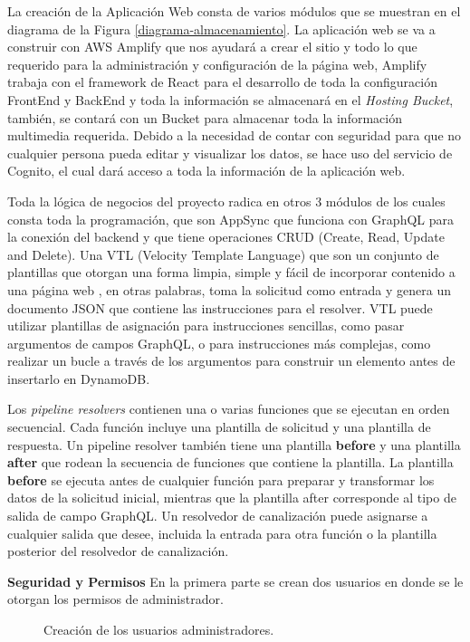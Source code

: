 \noindent La creación de la Aplicación Web consta de varios módulos que se muestran en el diagrama de la Figura \ref{diagrama-almacenamiento}. La aplicación web se va a construir con AWS Amplify que nos ayudará a crear el sitio y todo lo que requerido para la administración y configuración de la página web, Amplify trabaja con el framework de React para el desarrollo de toda la configuración FrontEnd y BackEnd y toda la información se almacenará en el \textit{Hosting Bucket}, también, se contará con un Bucket para almacenar toda la información multimedia requerida. Debido a la necesidad de contar con seguridad para que no cualquier persona pueda editar y visualizar los datos, se hace uso del servicio de Cognito, el cual dará acceso a toda la información de la aplicación web.

\noindent Toda la lógica de negocios del proyecto radica en otros 3 módulos de los cuales consta toda la programación, que son AppSync que funciona con GraphQL para la conexión del backend y que tiene operaciones CRUD (Create, Read, Update and Delete).
Una VTL (Velocity Template Language) que son un conjunto de plantillas que otorgan una forma limpia, simple y fácil de incorporar contenido a una página web \cite{apacheVTL}, en otras palabras, toma la solicitud como entrada y genera un documento JSON que contiene las instrucciones para el resolver. VTL puede utilizar plantillas de asignación para instrucciones sencillas, como pasar argumentos de campos GraphQL, o para instrucciones más complejas, como realizar un bucle a través de los argumentos para construir un elemento antes de insertarlo en DynamoDB.

\noindent Los \textit{pipeline resolvers} contienen una o varias funciones que se ejecutan en orden secuencial. Cada función incluye una plantilla de solicitud y una plantilla de respuesta. Un pipeline resolver también tiene una plantilla \textbf{before} y una plantilla \textbf{after} que rodean la secuencia de funciones que contiene la plantilla. La plantilla \textbf{before} se ejecuta antes de cualquier función para preparar y transformar los datos de la solicitud inicial, mientras que la plantilla after corresponde al tipo de salida de campo GraphQL. Un resolvedor de canalización puede asignarse a cualquier salida que desee, incluida la entrada para otra función o la plantilla posterior del resolvedor de canalización\cite{apacheVTL}.

\noindent \textbf{\large Seguridad y Permisos} \newline
En la primera parte se crean dos usuarios en donde se le otorgan los permisos de administrador.
\begin{figure}[H]
    \centering
    \caption{Creación de los usuarios administradores.}
\end{figure}

